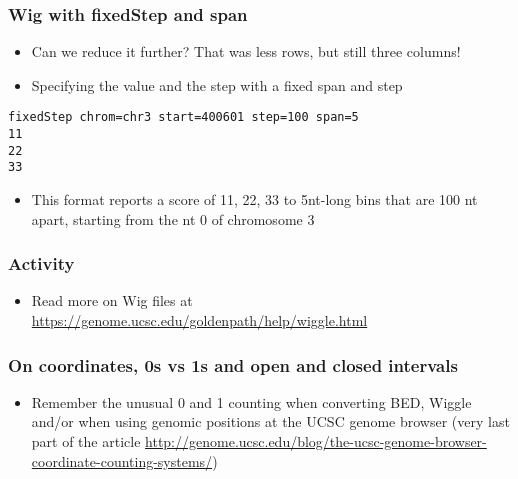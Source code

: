 \documentclass{beamer}
\begin{document}
\begin{frame}[fragile]
  \frametitle{Wig with fixedStep and span}
  \begin{itemize}
  \item Can we reduce it further? That was less rows, but still three columns!
  \item Specifying the value and the step with a fixed span and step
  \end{itemize}

\begin{verbatim}
fixedStep chrom=chr3 start=400601 step=100 span=5
11
22
33 
\end{verbatim}

  \begin{itemize}
  \item This format reports a score of 11, 22, 33 to 5nt-long bins that are 100 nt apart, starting from the nt 0 of chromosome 3
  \end{itemize}
\end{frame}


\begin{frame}
  \frametitle{Activity}
  \begin{itemize}
  \item Read more on Wig files at \url{https://genome.ucsc.edu/goldenpath/help/wiggle.html}
  \end{itemize}
\end{frame}




\begin{frame}
  \frametitle{On coordinates, 0s vs 1s and open and closed intervals}
  \begin{itemize}
  \item Remember the unusual 0 and 1 counting when converting BED, Wiggle and/or when using genomic positions at the UCSC genome browser  (very last part of the article \url{http://genome.ucsc.edu/blog/the-ucsc-genome-browser-coordinate-counting-systems/})
  \end{itemize}
\end{frame}


\end{document}
